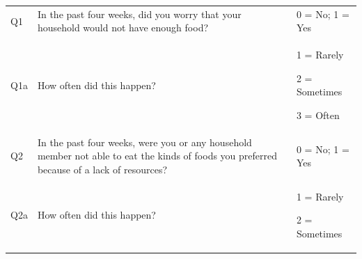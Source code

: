 \documentclass[12pt,]{book}
\theoremstyle{definition}
\theoremstyle{definition}
\theoremstyle{definition}
\theoremstyle{remark}
\begin{document}
\begin{longtable}[]{@{}lll@{}}
\toprule
\begin{minipage}[t]{0.07\columnwidth}\raggedright
Q1\strut
\end{minipage} & \begin{minipage}[t]{0.62\columnwidth}\raggedright
In the past four weeks, did you worry that your household would not have
enough food?\strut
\end{minipage} & \begin{minipage}[t]{0.22\columnwidth}\raggedright
0 = No; 1 = Yes\strut
\end{minipage}\tabularnewline
\begin{minipage}[t]{0.32\columnwidth}\raggedright
Q1a\strut
\end{minipage} & \begin{minipage}[t]{0.32\columnwidth}\raggedright
How often did this happen?\strut
\end{minipage} & \begin{minipage}[t]{0.32\columnwidth}\raggedright
1 = Rarely

2 = Sometimes

3 = Often\strut
\end{minipage}\tabularnewline
\begin{minipage}[t]{0.07\columnwidth}\raggedright
Q2\strut
\end{minipage} & \begin{minipage}[t]{0.62\columnwidth}\raggedright
In the past four weeks, were you or any household member not able to eat
the kinds of foods you preferred because of a lack of resources?\strut
\end{minipage} & \begin{minipage}[t]{0.22\columnwidth}\raggedright
0 = No; 1 = Yes\strut
\end{minipage}\tabularnewline
\begin{minipage}[t]{0.32\columnwidth}\raggedright
Q2a\strut
\end{minipage} & \begin{minipage}[t]{0.32\columnwidth}\raggedright
How often did this happen?\strut
\end{minipage} & \begin{minipage}[t]{0.32\columnwidth}\raggedright
1 = Rarely

2 = Sometimes


\end{minipage}
\end{longtable}
\end{document}
